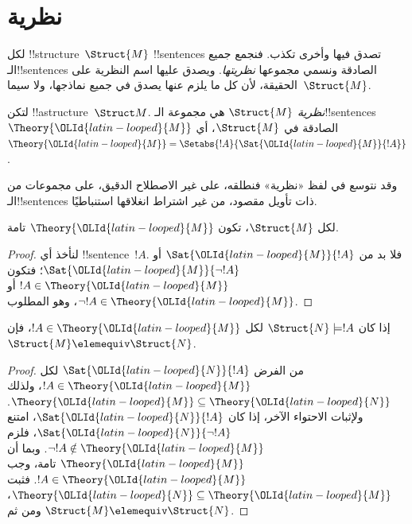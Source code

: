 \documentclass[../../../include/open-logic-section]{subfiles}
\begin{document}

\section{نظرية }

لكل !!{structure}~$\Struct{M}$ !!{sentence}s تصدق فيها
وأخرى تكذب. فنجمع جميع الـ!!{sentence}s الصادقة ونسمي مجموعها
\emph{نظريتها}. ويصدق عليها اسم النظرية على الحقيقة، لأن كل
ما يلزم عنها يصدق في جميع نماذجها، ولا سيما~$\Struct{M}$.

\begin{defn}
  لتكن !!a{structure}~$\Struct M$. \emph{نظرية} $\Struct{M}$ هي مجموعة
  الـ!!{sentence}s~$\Theory{{\OLId{latin-looped}{M}}}$ الصادقة في $\Struct{M}$، أي
  $\Theory{{\OLId{latin-looped}{M}}} = \Setabs{!A}{\Sat{{\OLId{latin-looped}{M}}}{!A}}$.
\end{defn}

وقد نتوسع في لفظ «نظرية» فنطلقه، على غير الاصطلاح الدقيق، على مجموعات
من الـ!!{sentence}s ذات تأويل مقصود، من غير اشتراط انغلاقها استنباطيًا.

\begin{prop}
لكل $\Struct{M}$، تكون $\Theory{{\OLId{latin-looped}{M}}}$ تامة.
\end{prop}

\begin{proof}
لنأخذ أي !!{sentence}~$!A$. فلا بد من $\Sat{{\OLId{latin-looped}{M}}}{!A}$ أو
$\Sat{{\OLId{latin-looped}{M}}}{\lnot !A}$؛ فتكون $!A \in \Theory{{\OLId{latin-looped}{M}}}$ أو
$\lnot !A \in \Theory{{\OLId{latin-looped}{M}}}$، وهو المطلوب.
\end{proof}

\begin{prop}
  إذا كان $\Struct{N} \models !A$ لكل $!A \in \Theory{{\OLId{latin-looped}{M}}}$، فإن
  $\Struct{M} \elemequiv \Struct{N}$.
\end{prop}

\begin{proof}
من الفرض $\Sat{{\OLId{latin-looped}{N}}}{!A}$ لكل $!A \in \Theory{{\OLId{latin-looped}{M}}}$، ولذلك
$\Theory{{\OLId{latin-looped}{M}}} \subseteq \Theory{{\OLId{latin-looped}{N}}}$. ولإثبات الاحتواء الآخر،
إذا كان $\Sat{{\OLId{latin-looped}{N}}}{!A}$، امتنع $\Sat{{\OLId{latin-looped}{N}}}{\lnot !A}$، فلزم
$\lnot !A \notin \Theory{{\OLId{latin-looped}{M}}}$. وبما أن $\Theory{{\OLId{latin-looped}{M}}}$ تامة،
وجب $!A \in \Theory{{\OLId{latin-looped}{M}}}$. فثبت
$\Theory{{\OLId{latin-looped}{N}}} \subseteq \Theory{{\OLId{latin-looped}{M}}}$، ومن ثم
$\Struct{M} \elemequiv \Struct{N}$.
\end{proof}
\end{document}

